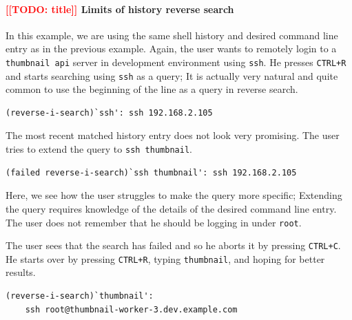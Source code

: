 \documentclass[thesis=M,english]{FITthesis}[2012/10/20]
\newcommand{\redtext}[1]{\textcolor{red}{[[#1]]}}
\begin{document}
\paragraph{\redtext{TODO: title} Limits of history reverse search}

In this example, we are using the same shell history and desired command line entry as in the previous example. Again, the user wants to remotely login to a \verb|thumbnail api| server in development environment using \verb|ssh|. He presses \verb|CTRL+R| and starts searching using \verb|ssh| as a query; It is actually very natural and quite common to use the beginning of the line as a query in reverse search.

\begin{verbatim}
(reverse-i-search)`ssh': ssh 192.168.2.105
\end{verbatim}

The most recent matched history entry does not look very promising. The user tries to extend the query to \verb|ssh thumbnail|.

\begin{verbatim}
(failed reverse-i-search)`ssh thumbnail': ssh 192.168.2.105
\end{verbatim}

Here, we see how the user struggles to make the query more specific; Extending the query requires knowledge of the details of the desired command line entry. The user does not remember that he should be logging in under \verb|root|.  %

The user sees that the search has failed and so he aborts it by pressing \verb|CTRL+C|. He starts over by pressing \verb|CTRL+R|, typing \verb|thumbnail|, and hoping for better results.



\begin{verbatim}
(reverse-i-search)`thumbnail':
    ssh root@thumbnail-worker-3.dev.example.com
\end{verbatim}
\end{document}
